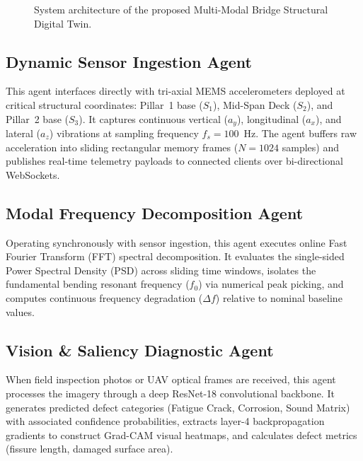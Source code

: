 \documentclass[10pt, conference, letterpaper]{IEEEtran}
\begin{document}
\begin{figure}[t]
\caption{System architecture of the proposed Multi-Modal Bridge Structural Digital Twin.}
\label{fig:arch}
\end{figure}

\subsection{Dynamic Sensor Ingestion Agent}
This agent interfaces directly with tri-axial MEMS accelerometers deployed at critical structural coordinates: Pillar~1 base ($S_1$), Mid-Span Deck ($S_2$), and Pillar~2 base ($S_3$). It captures continuous vertical ($a_y$), longitudinal ($a_x$), and lateral ($a_z$) vibrations at sampling frequency $f_s = 100$~Hz. The agent buffers raw acceleration into sliding rectangular memory frames ($N = 1024$ samples) and publishes real-time telemetry payloads to connected clients over bi-directional WebSockets.

\subsection{Modal Frequency Decomposition Agent}
Operating synchronously with sensor ingestion, this agent executes online Fast Fourier Transform (FFT) spectral decomposition. It evaluates the single-sided Power Spectral Density (PSD) across sliding time windows, isolates the fundamental bending resonant frequency ($f_0$) via numerical peak picking, and computes continuous frequency degradation ($\Delta f$) relative to nominal baseline values.

\subsection{Vision \& Saliency Diagnostic Agent}
When field inspection photos or UAV optical frames are received, this agent processes the imagery through a deep ResNet-18 convolutional backbone. It generates predicted defect categories (Fatigue Crack, Corrosion, Sound Matrix) with associated confidence probabilities, extracts layer-4 backpropagation gradients to construct Grad-CAM visual heatmaps, and calculates defect metrics (fissure length, damaged surface area).
\end{document}
